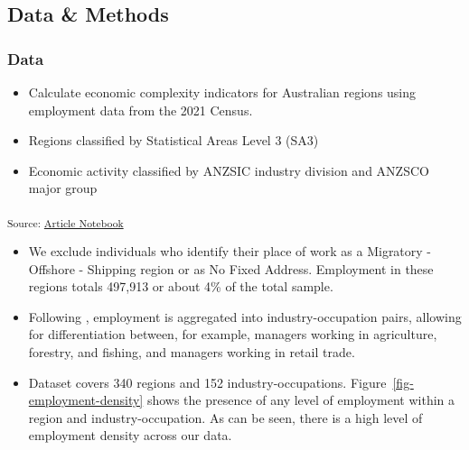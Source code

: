 \documentclass[
  number]{elsarticle}
\begin{document}
\subsection{Data \& Methods}\label{sec-data-methods}

\subsubsection{Data}\label{data}

\begin{itemize}
\item
  Calculate economic complexity indicators for Australian regions using
  employment data from the 2021 Census.
\item
  Regions classified by Statistical Areas Level 3 (SA3)
\item
  Economic activity classified by ANZSIC industry division and ANZSCO
  major group
\end{itemize}

\textsubscript{Source:
\href{https://aiti-flinders.github.io/sirp-complexity/index.qmd.html}{Article
Notebook}}

\begin{itemize}
\item
  We exclude individuals who identify their place of work as a Migratory
  - Offshore - Shipping region or as No Fixed Address. Employment in
  these regions totals 497,913 or about 4\% of the total sample.
\item
  Following \citep{ecnz}, employment is aggregated into
  industry-occupation pairs, allowing for differentiation between, for
  example, managers working in agriculture, forestry, and fishing, and
  managers working in retail trade.
\item
  Dataset covers 340 regions and 152 industry-occupations.
  Figure~\ref{fig-employment-density} shows the presence of any level of
  employment within a region and industry-occupation. As can be seen,
  there is a high level of employment density across our data.
\end{itemize}
\end{document}

